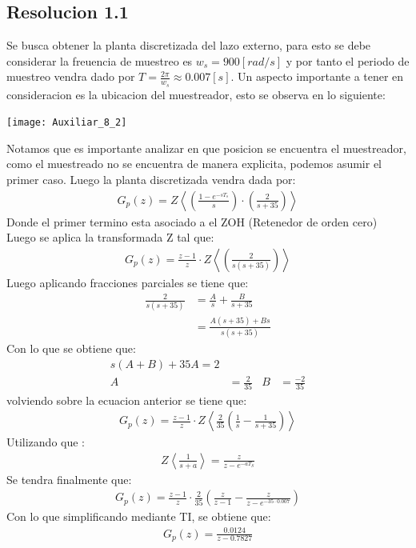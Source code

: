 \documentclass[
  11pt,
  letterpaper,
   addpoints,
  ]{exam}
\begin{document}
\begin{questions}
\begin{solution}
    \subsection*{Resolucion 1.1}
    Se busca obtener la planta discretizada del lazo externo, para esto se debe considerar la freuencia de muestreo es  $w_{s} = 900[rad/s]$ y por tanto el periodo de muestreo vendra dado por $T = \frac{2\pi}{w_{s}} \approx 0.007[s]$. Un aspecto importante a tener en consideracion es la ubicacion del muestreador, esto se observa en lo siguiente:
    \begin{center}
        \texttt{[image: Auxiliar\_8\_2]}
    \end{center}
    Notamos que es importante analizar en que posicion se encuentra el muestreador, como el muestreado no se encuentra de manera explicita, podemos asumir el primer caso. Luego la planta discretizada vendra dada por:
    \begin{align}
        G_{p}(z) = Z\left< \left(\frac{1-e^{-sT_{s}}}{s}\right) \cdot \left( \frac{2}{s+35}\right)\right>
    \end{align}
    Donde el primer termino esta asociado a el ZOH (Retenedor de orden cero) Luego se aplica la transformada Z tal que:
    \begin{align}
        G_{p}(z) = \frac{z-1}{z}\cdot Z\left< \left( \frac{2}{s(s+35)}\right)\right>
    \end{align}
    Luego aplicando fracciones parciales se tiene que:
    \begin{align}
        \frac{2}{s(s+35)} &= \frac{A}{s} + \frac{B}{s+35}\\
        &= \frac{A(s+35) + Bs}{s(s+35)}
    \end{align}
    Con lo que se obtiene que:
    \begin{align}
        s(A+B) + 35A = 2\\
        A&= \frac{2}{35} & B&=\frac{-2}{35}
    \end{align}
    volviendo sobre la ecuacion anterior se tiene que:
    \begin{align}
        G_{p}(z) = \frac{z-1}{z}\cdot Z\left< \frac{2}{35}\left(\frac{1}{s} - \frac{1}{s+35}\right)\right>
    \end{align}
    Utilizando que :
    \begin{align}
        Z\left<\frac{1}{s+a} \right> = \frac{z}{z-e^{-aT_{S}}}
    \end{align}
    Se tendra finalmente que:
    \begin{align}
        G_{p}(z) = \frac{z-1}{z}\cdot \frac{2}{35}\left(\frac{z}{z-1} - \frac{z}{z-e^{-35\cdot 0.007}}\right)
    \end{align}
    Con lo que simplificando mediante TI, se obtiene que:
    \begin{align}
        G_{p}(z)= \frac{0.0124}{z-0.7827}
    \end{align}

\end{solution}
\end{questions}
\end{document}
